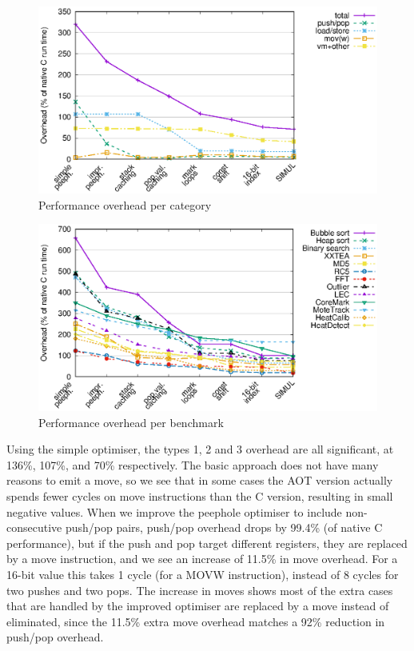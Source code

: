 \begin{figure}
\centering
\includegraphics[width=\mygraphsize]{performance-per-opcode-category.eps}
\caption{Performance overhead per category}
\label{fig-performance-per-opcode-category}
\end{figure}

\begin{figure}
\centering
\includegraphics[width=\mygraphsize]{performance-per-benchmark.eps}
\caption{Performance overhead per benchmark}
\label{fig-performance-per-benchmark}
\end{figure}

Using the simple optimiser, the types 1, 2 and 3 overhead are all significant, at 136\%,  107\%, and 70\% respectively. The basic approach does not have many reasons to emit a move, so we see that in some cases the AOT version actually spends fewer cycles on move instructions than the C version, resulting in small negative values.  When we improve the peephole optimiser to include non-consecutive push/pop pairs, push/pop overhead drops by 99.4\% (of native C performance), but if the push and pop target different registers, they are replaced by a move instruction, and we see an increase of 11.5\% in move overhead. For a 16-bit value this takes 1 cycle (for a MOVW instruction), instead of 8 cycles for two pushes and two pops. The increase in moves shows most of the extra cases that are handled by the improved optimiser are replaced by a move instead of eliminated, since the 11.5\% extra move overhead matches a 92\% reduction in push/pop overhead.

